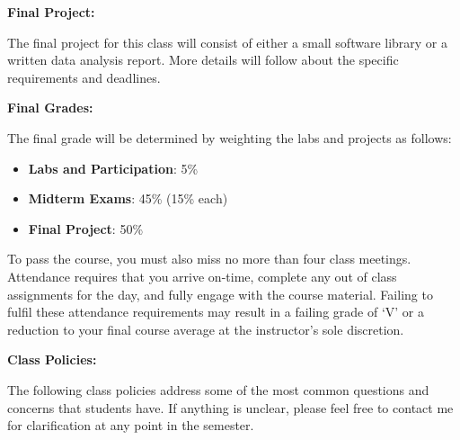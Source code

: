 \documentclass[12pt]{article}
\begin{document}
\bigskip

\textbf{Final Project:} \vspace{6pt}

The final project for this class will consist of either a small software
library or a written data analysis report. More details will follow about the
specific requirements and deadlines.

\bigskip

\textbf{Final Grades:} \vspace{6pt}

The final grade will be determined by weighting the labs and projects as
follows:
\begin{itemize}\setlength\itemsep{0em}
\item \textbf{Labs and Participation}: 5\%
\item \textbf{Midterm Exams}: 45\% (15\% each)
\item \textbf{Final Project}: 50\%
\end{itemize}
To pass the course, you must also miss no more than four class meetings.
Attendance requires that you arrive on-time, complete any out of class
assignments for the day, and fully engage with the course material.
Failing to fulfil these attendance requirements may result in a failing
grade of `V' or a reduction to your final course average at the instructor's
sole discretion.

\bigskip

\textbf{Class Policies:} \vspace{6pt}

The following class policies address some of the most common
questions and concerns that students have. If anything is
unclear, please feel free to contact me for clarification at
any point in the semester.
\end{document}
